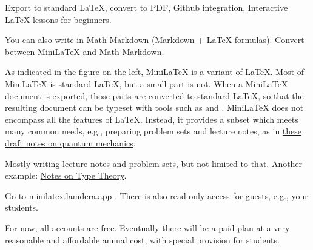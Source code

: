 \begin{defitem}

 Export to standard LaTeX, convert to PDF, Github integration,  \href{https://minilatex.lamdera.app/g/273}{Interactive LaTeX lessons for beginners}.

\medskip
You can also write in Math-Markdown (Markdown + LaTeX formulas).  Convert between MiniLaTeX and Math-Markdown.

\end{defitem}


\begin{defitem}


As indicated in the figure on the left, MiniLaTeX is a  variant of LaTeX.  Most of MiniLaTeX is standard LaTeX, but a small part is not.  When a MiniLaTeX document is exported, those parts are converted to standard LaTeX, so that the resulting document can be typeset with tools such as  and .  
\medskip
MiniLaTeX does not encompass all the features of LaTeX.  Instead, it provides a subset which meets many common needs, e.g., preparing problem sets and lecture notes, as in \href{https://minilatex.lamdera.app/g/uuid:6f5a573d-5603-4470-8dc9-b0972997a6e6}{these draft notes on quantum mechanics}.




\end{defitem}

\begin{defitem}
Mostly writing lecture notes and problem sets, but not limited to that.  Another example: \href{https://minilatex.lamdera.app/g/263}{Notes on Type Theory}.
\end{defitem}


\begin{defitem}
Go to \href{https://minilatex.lamdera.app}{minilatex.lamdera.app} . There is also read-only access for guests, e.g., your students.
\end{defitem}

\begin{defitem}
For now, all accounts are free. Eventually there will be a paid plan at a very reasonable and affordable annual cost, with special provision for students.  
\end{defitem}

